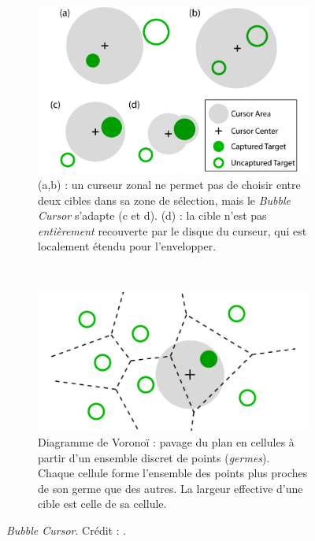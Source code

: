 	\begin{figure}[htbp]
		\begin{subfigure}[t]{0.45\textwidth}
			\centering
			\includegraphics[width=\textwidth]{figures/ch2/bubble}
			\caption{(a,b) : un curseur zonal ne permet pas de choisir entre deux cibles dans sa zone de sélection, mais le \emph{Bubble Cursor} s'adapte (c et d). (d) : la cible n'est pas \emph{entièrement} recouverte par le disque du curseur, qui est localement étendu pour l'envelopper.}
			\label{fig:bubble}
		\end{subfigure}
		~
		\begin{subfigure}[t]{0.53\textwidth}
			\centering
			\includegraphics[width=\textwidth]{figures/ch2/voronoi}
			\caption{Diagramme de Voronoï : pavage du plan en cellules à partir d'un ensemble discret de points (\emph{germes}). Chaque cellule forme l'ensemble des points plus proches de son germe que des autres. La largeur effective d'une cible est celle de sa cellule.}
			\label{fig:voronoi}
		\end{subfigure}
		\caption[\emph{Bubble Cursor}]{\emph{Bubble Cursor}. Crédit : \cite{grossman2005bubble}.}
		\label{fig:bubbleVoronoi}
	\end{figure}
	
